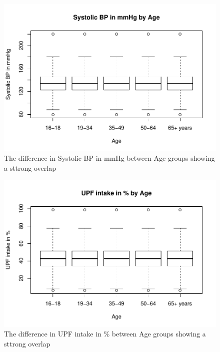\documentclass[
]{article}
\begin{document}
\begin{figure}
\centering
\includegraphics{methodandresults_files/figure-latex/fig-BP-age-Boxplots-1.pdf}
\caption{The difference in Systolic BP in mmHg between Age groups
showing a sttrong overlap}
\end{figure}

\begin{figure}
\centering
\includegraphics{methodandresults_files/figure-latex/fig-UPF-age-Boxplots-1.pdf}
\caption{The difference in UPF intake in \% between Age groups showing a
sttrong overlap}
\end{figure}
\end{document}
